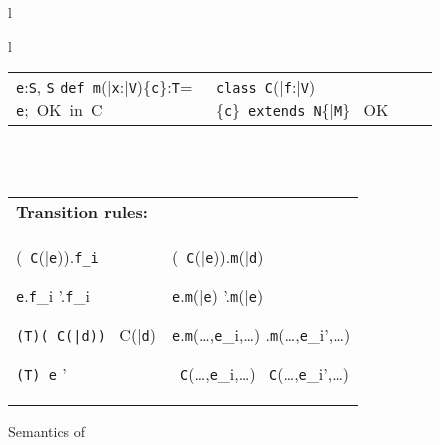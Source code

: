 \begin{figure*}
\begin{tabular}{l}
{\begin{tabular}{l}
\begin{tabular}{p{}p{}}
{	  {\tt e}:{\tt S}, {\tt S} \subtype {\tt T}}
	{{\tt def}\ {\tt m}(\bar{\tt x}:\bar{\tt V})\{{\tt c}\}:{\tt T}= {\tt e};\ \mbox{OK in}\ C}
	&
\infrule[Class OK]
	{\bar{\tt M}\ \mbox{OK in}\ {\tt C}\andalso \this:{\tt C}\vdash {\tt c}:o \andalso \this:{\tt C},{\tt c} \vdash \bar{\tt V}\ \type, {\tt N}\ \type}
	{\mbox{\tt class}\ {\tt C}(\bar{\tt f}:\bar{\tt V})\{{\tt c}\}\ 
	  \mbox{\tt extends}\ {\tt N}\{\bar{\tt M}\} \ \mbox{OK}}
\end{tabular}
\end{tabular}}\\
\quad\\
{\tabcolsep=0pt
\begin{tabular}{p{0.43\textwidth}@{\quad}p{0.54\textwidth}}
\multicolumn{2}{l}{\bf Transition rules:}\\
\typicallabel{RC-Field}
\infrule[\RField]
	{\tt x:C \vdash \fields(\tt x)=\bar{\tt f}:\bar{\tt V}}
	{(\new\ {\tt C}(\bar{\tt e})).{\tt f_i} \derives {\tt e_i}}

\infrule[\RCField]%
	{{\tt e} \derives {{\tt e}}'}
	{{\tt e}.{\tt f}_i \derives {{\tt e}}'.{\tt f}_i}

\infrule[\RCast]%
	{\vdash {\tt C}\{\self==\new\ C(\bar{\tt d})\} \subtype {\tt T}}
	{{\tt (T)(\new\ C(\bar{\tt d}))} \derives \new\ C(\bar{\tt d})}

\infrule[\RCCast]%
	{{\tt e} \derives {{\tt e}}'}
	{{\tt (T) e} \derives {{\tt (T) e}}'}
	&
	\typicallabel{R-Invk-Recv}
	\infrule[\RInvk]
		{{\tt x:C}\vdash {\tt x}\ \has\ {\tt m}(\bar{\tt x}:\bar{\tt T}){\tt \{c\}:T=e}}
		{(\new\ {\tt C}(\bar{\tt e})).{\tt m}(\bar{\tt d}) \derives {\tt e[\new\ {\tt C}(\bar{\tt e}),\bar{\tt d}/\this,\bar{\tt x}]}}

	\infrule[\RCInvkRecv]%
		{{\tt e} \derives {{\tt e}}'}
		{{\tt e}.{\tt m}(\bar{\tt e}) \derives {{\tt e}}'.{\tt m}(\bar{\tt e})}

	\infrule[\RCInvkArg]%
		{{\tt e}_i \derives {{\tt e}_i}'}
		{{\tt e}.{\tt m}(\ldots,{\tt e}_i,\ldots) \derives {{\tt e}}.{\tt m}(\ldots,{\tt e}_i',\ldots)} 

	\infrule[\RCNewArg]%
		{{\tt e}_i \derives {{\tt e}_i}'}
		{\new\ {\tt C}(\ldots,{\tt e}_i,\ldots) \derives \new\ {\tt C}(\ldots,{\tt e}_i',\ldots)}
\end{tabular}
}
\end{tabular}  
 \caption{Semantics of \FX}\label{fig:FX}
\end{figure*}
